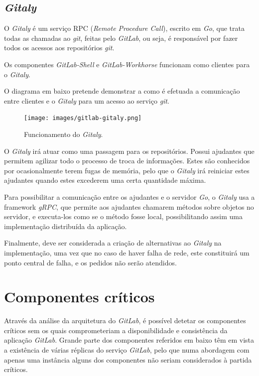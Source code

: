 \documentclass[12pt,a4paper]{article}
\begin{document}
\subsection{\emph{Gitaly}}
O \emph{Gitaly} é um serviço RPC (\emph{Remote Procedure Call}), escrito em \textit{Go}, que trata todas as chamadas ao \emph{git}, feitas pelo \emph{GitLab}, ou seja, é responsável por fazer todos os acessos aos repositórios \emph{git}.

Os componentes \emph{GitLab-Shell} e \emph{GitLab-Workhorse} funcionam como clientes para o \emph{Gitaly}.

O diagrama em baixo pretende demonstrar a como é efetuada a comunicação entre clientes e o \emph{Gitaly} para um acesso ao serviço \emph{git}.

\begin{figure}[H]
  \centering
  \texttt{[image: images/gitlab-gitaly.png]}
  \caption{Funcionamento do \emph{Gitaly}.}
\end{figure}

O \textit{Gitaly} irá atuar como uma passagem para os repositórios. Possui ajudantes que permitem agilizar todo o processo de troca de informações. Estes são conhecidos por ocasionalmente terem fugas de memória, pelo que o \textit{Gitaly} irá reiniciar estes ajudantes quando estes excederem uma certa quantidade máxima.

Para possibilitar a comunicação entre os ajudantes e o servidor \textit{Go}, o \textit{Gitaly} usa a framework \textit{gRPC}, que permite aos ajudantes chamarem métodos sobre objetos no servidor, e executa-los como se o método fosse local, possibilitando assim uma implementação distribuída da aplicação.

Finalmente, deve ser considerada a criação de alternativas ao \textit{Gitaly} na implementação, uma vez que no caso de haver falha de rede, este constituirá um ponto central de falha, e os pedidos não serão atendidos.





\newpage
\section{Componentes críticos}

Através da análise da arquitetura do \emph{GitLab}, é possível detetar os componentes críticos sem os quais comprometeriam a disponibilidade e consistência da aplicação \emph{GitLab}. Grande parte dos componentes referidos em baixo têm em vista a existência de várias réplicas do serviço \emph{GitLab}, pelo que numa abordagem com apenas uma instância alguns dos componentes não seriam considerados à partida críticos.
\end{document}
